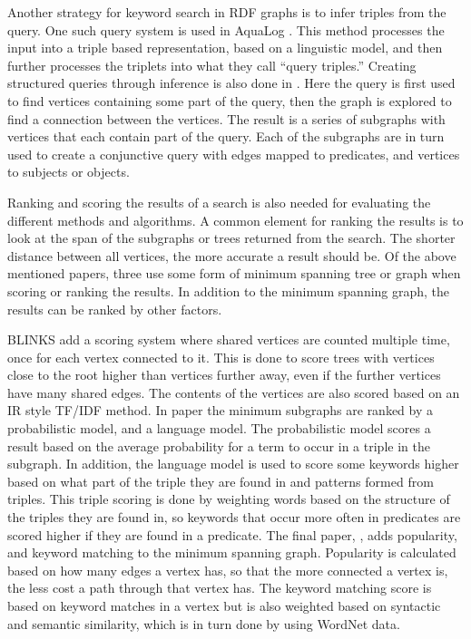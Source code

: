 Another strategy for keyword search in RDF graphs is to infer triples from the query. One such query system is used in AquaLog \citep{aqualog}. This method processes the input into a triple based representation, based on a linguistic model, and then further processes the triplets into what they call ``query triples.'' Creating structured queries through inference is also done in \cite{4812421}. Here the query is first used to find vertices containing some part of the query, then the graph is explored to find a connection between the vertices. The result is a series of subgraphs with vertices that each contain part of the query. Each of the subgraphs are in turn used to create a conjunctive query with edges mapped to predicates, and vertices to subjects or objects.

Ranking and scoring the results of a search is also needed for evaluating the different methods and algorithms. A common element for ranking the results is to look at the span of the subgraphs or trees returned from the search. The shorter distance between all vertices, the more accurate a result should be. Of the above mentioned papers, three \cite{blinks, Elbassuoni:2011:KSO:2063576.2063615, 4812421} use some form of minimum spanning tree or graph when scoring or ranking the results. In addition to the minimum spanning graph, the results can be ranked by other factors. %

BLINKS add a scoring system where shared vertices are counted multiple time, once for each vertex connected to it. This is done to score trees with vertices close to the root higher than vertices further away, even if the further vertices have many shared edges. The contents of the vertices are also scored based on an IR style TF/IDF method. In paper \cite{Elbassuoni:2011:KSO:2063576.2063615} the minimum subgraphs are ranked by a probabilistic model, and a language model. The probabilistic model scores a result based on the average probability for a term to occur in a triple in the subgraph. In addition, the language model is used to score some keywords higher based on what part of the triple they are found in and patterns formed from triples. This triple scoring is done by weighting words based on the structure of the triples they are found in, so keywords that occur more often in predicates are scored higher if they are found in a predicate. The final paper, \cite{4812421}, adds popularity, and keyword matching to the minimum spanning graph. Popularity is calculated based on how many edges a vertex has, so that the more connected a vertex is, the less cost a path through that vertex has. The keyword matching score is based on keyword matches in a vertex but is also weighted based on syntactic and semantic similarity, which is in turn done by using WordNet data.

